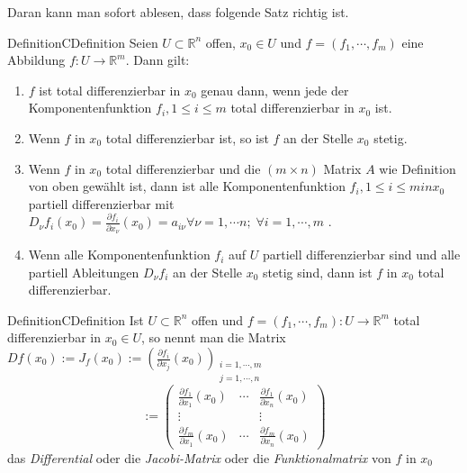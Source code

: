 
%

%
Daran kann man sofort ablesen, dass folgende Satz richtig ist.
	\begin{ibox}[32]{Definition}{CDefinition}
	   Seien $ U \subset \mathbb{R}^n $  offen, $ x_0 \in U $ und $ f = \left( f_1, \cdots, f_{m} \right)  $  
	   eine Abbildung $ f:U \to \mathbb{R}^m $. Dann gilt:
	   \begin{enumerate}[label=\alph*)]
	   	\item $ f $ ist total differenzierbar in $ x_0 $ genau dann, wenn jede der Komponentenfunktion $ f_{i}, 1 \leq i \leq m	 $
			total differenzierbar in $ x_0 $ ist.
		\item Wenn $ f $ in $ x_0 $ total differenzierbar ist, so ist $ f $ an der Stelle $ x_0 $ stetig.
		\item Wenn $ f $ in $ x_0 $ total differenzierbar und die $ \left( m \times n \right)  $ Matrix $ A $ wie Definition
			von oben gewählt ist, dann ist alle Komponentenfunktion $f_{i}, 1 \leq i \leq m in x_0 $ partiell differenzierbar
			mit $ D_{\nu} f_{i}(x_0) = \frac{\partial f_{i}}{\partial x_{\nu}} (x_0) = a_{i \nu} \forall \nu = 1, \cdots n 
			; \; \forall  i = 1, \cdots, m$ . 
		\item Wenn alle Komponentenfunktion $ f_{i} $ auf $ U $ partiell differenzierbar sind und alle partiell Ableitungen
			$ D_{\nu}f_{i} $ an der Stelle $ x_0 $ stetig sind, dann ist $ f $ in $ x_0 $ total differenzierbar.
	   \end{enumerate}
	\end{ibox}
	 
	\begin{ibox}[]{Definition}{CDefinition}
	    Ist $ U \subset  \mathbb{R}^n  $ offen und $ f = \left( f_1, \cdots, f_{m} \right) : U \to \mathbb{R}^m $ total 
		differenzierbar in $ x_0 \in  U $, so nennt man die Matrix $ Df(x_0) := J_{f}(x_0) := 
		\left( \frac{\partial f_{i}}{\partial x_{j}} (x_0) \right)_{\substack{i = 1 , \cdots, m \\ j = 1, \cdots, n}}  $
		$$ := \begin{pmatrix}
			\frac{\partial f_1}{\partial x_1} (x_0) & \cdots & \frac{\partial f_1}{\partial x_{n}} (x_{0}) \\
			\vdots & &\vdots\\
			\frac{\partial f_{m}}{\partial x_{1}} (x_0) & \cdots & \frac{\partial f_{m}}{\partial x_{n}} (x_0)
		\end{pmatrix}
		 $$
	das \textit{Differential} oder die \textit{Jacobi-Matrix } oder die \textit{Funktionalmatrix } von $ f  $ in $ x_0 $  	
	\end{ibox}
	
